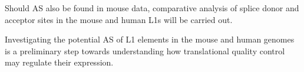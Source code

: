\documentclass[12pt]{article}
\begin{document}
		Should AS also be found in mouse data, comparative analysis of splice donor and acceptor sites in the mouse and human L1s will be carried out.
		 
		
		Investigating the potential AS of L1 elements in the mouse and human genomes is a preliminary step towards understanding how translational quality control may regulate their expression.
		
%		 



		
\end{document}
